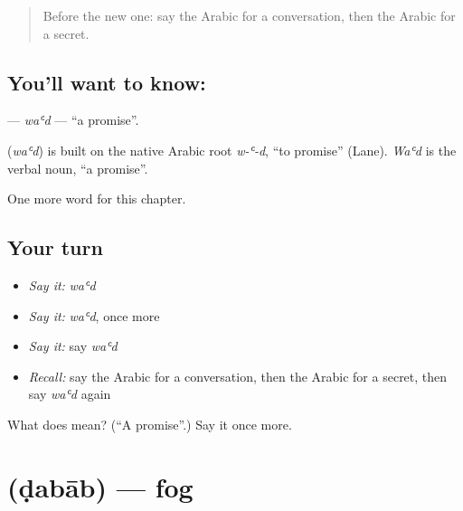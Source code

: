 \label{lesson:AR-C216-wad}



\begin{quote}
Before the new one: say the Arabic for a conversation, then the Arabic for a secret.
\end{quote}

\subsection*{You'll want to know: }
\textbf{} — \emph{waʿd} — \textquotedblleft{}a promise\textquotedblright{}.

\begin{cousinweb}
\textbf{} (\emph{waʿd}) is built on the native Arabic root \emph{w-ʿ-d}, \textquotedblleft{}to promise\textquotedblright{} (Lane). \emph{Waʿd} is the verbal noun, \textquotedblleft{}a promise\textquotedblright{}.
\end{cousinweb}

\begin{grammarlens}[title={What you've built}]
One more word for this chapter.
\end{grammarlens}

\subsection*{Your turn}
\begin{itemize}
\raggedright
  \item \emph{Say it:} \emph{waʿd}
  \item \emph{Say it:} \emph{waʿd}, once more
  \item \emph{Say it:} say \emph{waʿd}
  \item \emph{Recall:} say the Arabic for a conversation, then the Arabic for a secret, then say \emph{waʿd} again
\end{itemize}

\begin{tcolorbox}[breakable,colback=teal!4,colframe=teal!35!black,title={Before you move on}]
What does  mean? (\textquotedblleft{}A promise\textquotedblright{}.) Say it once more.
\end{tcolorbox}
\section[\texorpdfstring{\ar{ضباب} (ḍabāb)}{ضباب (ḍabāb)}]{ (ḍabāb) — fog}

\label{lesson:AR-C216-dabab}



